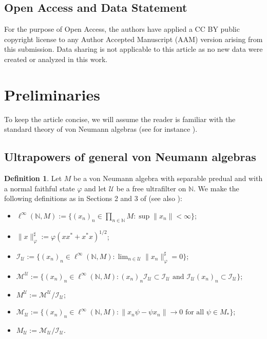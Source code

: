 \documentclass[10pt]{amsart}
\numberwithin{equation}{section}
\theoremstyle{definition}
\newtheorem{defn}[thm]{Definition}
\newcommand{\N}{\mathbb{N}}
\newcommand{\cI}{\mathcal{I}}
\newcommand{\cM}{\mathcal{M}}
\newcommand{\cU}{\mathcal{U}}
\begin{document}
\subsection*{Open Access and Data Statement}

For the purpose of Open Access, the authors have applied a CC BY public copyright license to any Author Accepted Manuscript (AAM) version arising from this submission. Data sharing is not applicable to this article as no new data were created or analyzed in this work.

\section{Preliminaries} \label{sec: preliminaries}



To keep the article concise, we will assume the reader is familiar with the standard theory of von Neumann algebras (see for instance \cite{anantharaman-popa, BrownOzawa2008}). 

\subsection{Ultrapowers of general von Neumann algebras}

\begin{defn}
    Let $M$ be a von Neumann algebra with separable predual and with a normal faithful state $\varphi$ and let $\cU$ be a free ultrafilter on $\N$. We make the following definitions as in Sections 2 and 3 of \cite{AndoHaag2014typeIIIultra} (see also \cite[Section~5]{Oceanu1985}):
    \begin{itemize}
        
        \item $\ell^\infty(\N,M) := \{(x_n)_n \in \prod_{n\in\N}M : \sup \|x_n\| < \infty\}$;
        \item $\|x\|_\varphi^\sharp := \varphi(xx^* + x^*x)^{1/2}$;
        \item $\cI_\cU := \{(x_n)_n\in \ell^\infty(\N,M) : \lim_{n\in\cU}\|x_n\|_\varphi^\sharp = 0\}$;
        \item $\cM^\cU := \{(x_n)_n\in \ell^\infty(\N,M) : (x_n)_n\cI_\cU\subset\cI_\cU \text{ and }\cI_\cU(x_n)_n\subset\cI_\cU \}$;
        \item $M^\cU := \cM^\cU /\cI_\cU$;
        \item $\cM_\cU := \{(x_n)_n\in \ell^\infty(\N,M) : \|x_n\psi -\psi x_n\| \to 0 \text{ for all } \psi\in M_* \}$;
        \item $M_\cU := \cM_\cU / \cI_\cU$.
    \end{itemize}
\end{defn}
\end{document}
